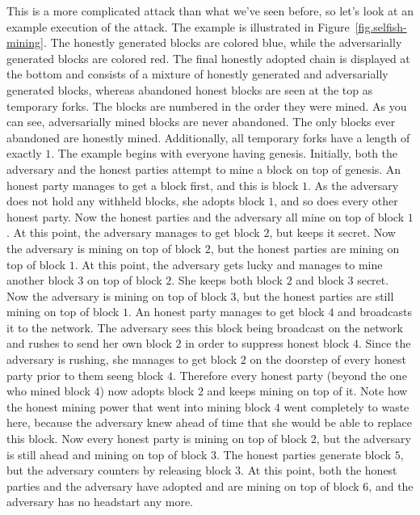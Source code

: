 This is a more complicated attack than what we've seen before, so let's look at an example
execution of the attack. The example is illustrated in Figure~\ref{fig.selfish-mining}. The
honestly generated blocks are colored blue, while the adversarially generated blocks are
colored red. The final honestly adopted chain is displayed at the bottom and consists of a
mixture of honestly generated and adversarially generated blocks, whereas abandoned honest
blocks are seen at the top as temporary forks. The blocks are numbered in the order they were
mined. As you can see, adversarially mined blocks are never abandoned. The only blocks ever
abandoned are honestly mined. Additionally, all temporary forks have a length of exactly $1$.
The example begins with everyone having genesis. Initially, both the adversary and the honest
parties attempt to mine a block on top of genesis. An honest party manages to get a block first,
and this is block $1$. As the adversary does not hold any withheld blocks, she adopts block
$1$, and so does every other honest party. Now the honest parties and the adversary all mine
on top of block $1$. At this point, the adversary manages to get block $2$, but keeps it secret.
Now the adversary is mining on top of block $2$, but the honest parties are mining on top of
block $1$. At this point, the adversary gets lucky and manages to mine another block $3$
on top of block $2$. She keeps both block $2$ and block $3$ secret. Now the adversary is mining
on top of block $3$, but the honest parties are still mining on top of block $1$. An honest
party manages to get block $4$ and broadcasts it to the network. The adversary
sees this block being broadcast on the network and rushes to send her own block $2$ in order to
suppress honest block $4$. Since the adversary is rushing, she manages to get block $2$ on
the doorstep of every honest party prior to them seeng block $4$. Therefore every honest
party (beyond the one who mined block $4$) now adopts block $2$ and keeps mining on top of it.
Note how the honest mining power that went into mining block $4$ went completely to waste
here, because the adversary knew ahead of time that she would be able to replace this block.
Now every honest party is mining on top of block $2$, but the adversary is still ahead and
mining on top of block $3$. The honest parties generate block $5$, but the adversary counters
by releasing block $3$. At this point, both the honest parties and the adversary have adopted
and are mining on top of block $6$, and the adversary has no headstart any more.

